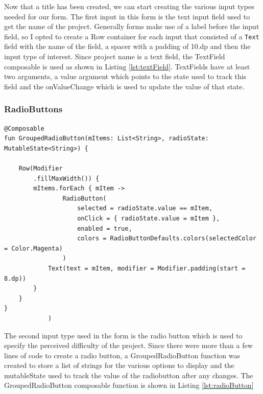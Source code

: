 \documentclass[12pt]{article}
\begin{document}
Now that a title has been created, we can start creating the various input types needed for our form. The first input in this form is the text input field used to get the name of the project. Generally forms make use of a label before the input field, so I opted to create a Row container for each input that consisted of a \verb|Text| field with the name of the field, a spacer with a padding of 10.dp and then the input type of interest. Since project name is a text field, the TextField composable is used as shown in Listing \ref{lst:textField}. TextFields have at least two arguments, a value argument which points to the state used to track this field and the onValueChange which is used to update the value of that state. 

\subsubsection{RadioButtons} 

\begin{lstlisting}[numbers=none, 
			caption=Radiobutton inputs,
			label={lst:radioButton}]
@Composable
fun GroupedRadioButton(mItems: List<String>, radioState: MutableState<String>) {

    Row(Modifier
        .fillMaxWidth()) {
        mItems.forEach { mItem ->
                RadioButton(
                    selected = radioState.value == mItem,
                    onClick = { radioState.value = mItem },
                    enabled = true,
                    colors = RadioButtonDefaults.colors(selectedColor = Color.Magenta)
                )
            Text(text = mItem, modifier = Modifier.padding(start = 8.dp))
        }
    }
}
            )
\end{lstlisting}
The second input type used in the form is the radio button which is used to specify the perceived difficulty of the project. Since there were more than a few lines of code to create a radio button, a GroupedRadioButton function was created to store a list of strings for the various options to display and the mutableState used to track the value of the radiobutton after any changes. The GroupedRadioButton composable function is shown in Listing \ref{lst:radioButton}
\end{document}
